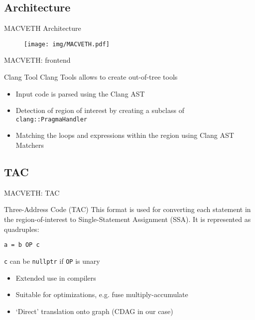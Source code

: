 \documentclass[xcolor=table,hideothersubsections,aspectratio=1610]{beamer}
\begin{document}
\subsection{Architecture}
\begin{frame}{MACVETH Architecture}
\begin{figure}
    \centering
    \texttt{[image: img/MACVETH.pdf]}
\end{figure}
\end{frame}

\begin{frame}{MACVETH: frontend}
\begin{block}{Clang Tool}
Clang Tools allows to create out-of-tree tools
\end{block}
\begin{itemize}
    \item Input code is parsed using the Clang AST
    \item Detection of region of interest by creating a subclass of \texttt{clang::PragmaHandler}
    \item Matching the loops and expressions within the region using Clang AST Matchers
\end{itemize}
\end{frame}


\subsection{TAC}
\begin{frame}{MACVETH: TAC}
\begin{block}{Three-Address Code (TAC)}
This format is used for converting each statement in the region-of-interest to Single-Statement Assignment (SSA). It is represented as quadruples:
\begin{center}
    \texttt{a = b OP c}
\end{center}
\texttt{c} can be \texttt{nullptr} if \texttt{OP} is unary
\end{block}

\begin{itemize}
    \item Extended use in compilers
    \item Suitable for optimizations, e.g. fuse multiply-accumulate
    \item `Direct' translation onto graph (CDAG in our case)
\end{itemize}

\end{frame}
\end{document}
